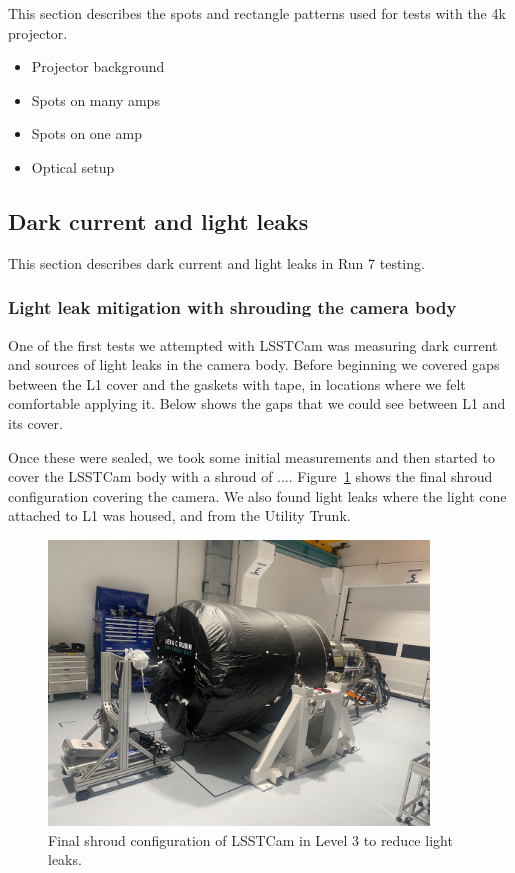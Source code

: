 This section describes the spots and rectangle patterns used for tests with the 4k
projector.

\begin{itemize}
\tightlist
\item
  Projector background
\item
  Spots on many amps
\item
  Spots on one amp
\item
  Optical setup
\end{itemize}

\subsection{Dark current and light
leaks}\label{dark-current-and-light-leaks}

This section describes dark current and light leaks in Run 7 testing.

\subsubsection{Light leak mitigation with shrouding the camera
body}\label{light-leak-mitigation-with-shrouding-the-camera-body}

One of the first tests we attempted with LSSTCam was measuring dark
current and sources of light leaks in the camera body. Before beginning we covered gaps between the L1 cover and the gaskets with tape, in locations where we felt comfortable applying it. Below shows the gaps that
we could see between L1 and its cover.

Once these were sealed, we took some initial measurements and then
started to cover the LSSTCam body with a shroud of .... Figure~\ref{fig:shroud} shows the final shroud configuration covering the
camera.
We also found light leaks
where the light cone attached to L1 was housed, and from the Utility
Trunk. 


\begin{figure}
\centering
\includegraphics[width=0.9\textwidth]{sections/figures/Camera_Shroud.jpg}
\caption{Final shroud configuration of LSSTCam in Level 3 to reduce
light leaks.}
\label{fig:shroud}
\end{figure}

